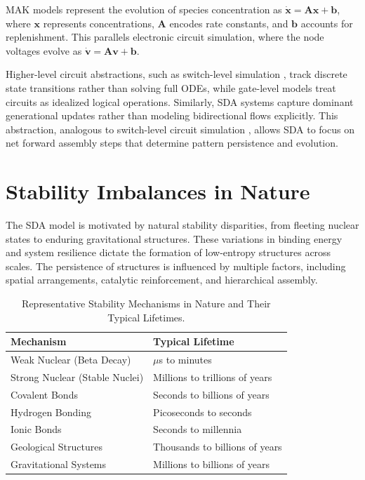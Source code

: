\documentclass[preprint,12pt]{elsarticle}
\begin{document}
MAK models represent the evolution of species concentration as $\dot{\mathbf{x}} = \mathbf{A}\mathbf{x} + \mathbf{b}$, where \(\mathbf{x}\) represents concentrations, \(\mathbf{A}\) encodes rate constants, and \(\mathbf{b}\) accounts for replenishment. This parallels electronic circuit simulation, where the node voltages evolve as $\dot{\mathbf{v}} = \mathbf{A}\mathbf{v} + \mathbf{b}$.

Higher-level circuit abstractions, such as switch-level simulation \cite{AdlerCAD}, track discrete state transitions rather than solving full ODEs, while gate-level models treat circuits as idealized logical operations. Similarly, SDA systems capture dominant generational updates rather than modeling bidirectional flows explicitly. This abstraction, analogous to switch-level circuit simulation , allows SDA to focus on net forward assembly steps that determine pattern persistence and evolution.


\section{Stability Imbalances in Nature}

The SDA model is motivated by natural stability disparities, from fleeting nuclear states to enduring gravitational structures. These variations in binding energy and system resilience dictate the formation of low-entropy structures across scales. The persistence of structures is influenced by multiple factors, including spatial arrangements, catalytic reinforcement, and hierarchical assembly.

\begin{table}
\centering
\caption{Representative Stability Mechanisms in Nature and Their Typical Lifetimes.}
\label{tab:binding-forces}
\footnotesize
\begin{tabular}{l l}
\toprule
\textbf{Mechanism} & \textbf{Typical Lifetime} \\
\midrule
Weak Nuclear (Beta Decay) & $\mu$s to minutes \\
Strong Nuclear (Stable Nuclei) & Millions to trillions of years \\
Covalent Bonds & Seconds to billions of years \\
Hydrogen Bonding & Picoseconds to seconds \\
Ionic Bonds & Seconds to millennia \\
Geological Structures & Thousands to billions of years \\
Gravitational Systems & Millions to billions of years \\
\bottomrule
\end{tabular}
\end{table}
\end{document}
